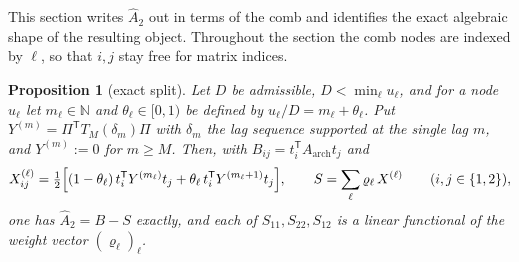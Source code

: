 \documentclass[11pt,a4paper]{article}
\theoremstyle{plain}
\newtheorem{proposition}[theorem]{Proposition}
\theoremstyle{definition}
\newcommand{\N}{\mathbb{N}}
\newcommand{\T}{\mathsf{T}}
\newcommand{\Tm}[1]{T_{#1}}
\newcommand{\Ah}{\widehat{A}}
\begin{document}
This section writes $\Ah_2$ out in terms of the comb and identifies the exact
algebraic shape of the resulting object. Throughout the section the comb nodes
are indexed by $\ell$, so that $i,j$ stay free for matrix indices.

\begin{proposition}[exact split]
\label{prop:split}
Let $D$ be admissible, $D<\min_\ell u_\ell$, and for a node $u_\ell$ let
$m_\ell\in\N$ and $\theta_\ell\in[0,1)$ be defined by
$u_\ell/D=m_\ell+\theta_\ell$. Put $Y^{(m)}=\Pi^{\T}\Tm{M}(\delta_{m})\Pi$ with
$\delta_m$ the lag sequence supported at the single lag $m$, and $Y^{(m)}:=0$
for $m\ge M$. Then, with $B_{ij}=t_i^{\T}A_{\mathrm{arch}}t_j$ and
\begin{equation}
\label{eq:split}
  X^{(\ell)}_{ij}
  =\tfrac12\Bigl[(1-\theta_\ell)\,t_i^{\T}Y^{(m_\ell)}t_j
  +\theta_\ell\,t_i^{\T}Y^{(m_\ell+1)}t_j\Bigr],
  \qquad
  S=\sum_\ell\varrho_\ell\,X^{(\ell)}
  \qquad(i,j\in\{1,2\}),
\end{equation}
one has $\Ah_2=B-S$ exactly, and each of $S_{11},S_{22},S_{12}$ is a
\emph{linear} functional of the weight vector $(\varrho_\ell)_\ell$.
\end{proposition}
\end{document}
